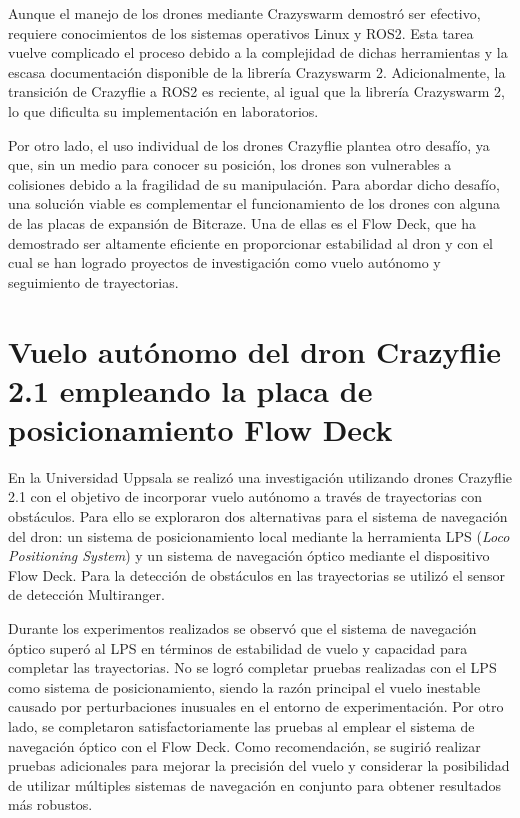 Aunque el manejo de los drones mediante Crazyswarm demostró ser efectivo, requiere conocimientos de los sistemas operativos Linux y ROS2. Esta tarea vuelve complicado el proceso debido a la complejidad de dichas herramientas y la escasa documentación disponible de la librería Crazyswarm 2. Adicionalmente, la transición de Crazyflie a ROS2 es reciente, al igual que la librería Crazyswarm 2, lo que dificulta su implementación en laboratorios. 

Por otro lado, el uso individual de los drones Crazyflie plantea otro desafío, ya que, sin un medio para conocer su posición, los drones son vulnerables a colisiones debido a la fragilidad de su manipulación. Para abordar dicho desafío, una solución viable es complementar el funcionamiento de los drones con alguna de las placas de expansión de Bitcraze. Una de ellas es el Flow Deck, que ha demostrado ser altamente eficiente en proporcionar estabilidad al dron y con el cual se han logrado proyectos de investigación como vuelo autónomo y seguimiento de trayectorias.

\newpage
\section{Vuelo autónomo del dron Crazyflie 2.1 empleando la placa de posicionamiento Flow Deck}
En la Universidad Uppsala \cite{Chadehumbe2020_tesis} se realizó una investigación utilizando drones Crazyflie 2.1 con el objetivo de incorporar vuelo autónomo a través de trayectorias con obstáculos. Para ello se exploraron dos alternativas para el sistema de navegación del dron: un sistema de posicionamiento local mediante la herramienta LPS (\textit{Loco Positioning System}) y un sistema de navegación óptico mediante el dispositivo Flow Deck. Para la detección de obstáculos en las trayectorias se utilizó el sensor de detección Multiranger. 

Durante los experimentos realizados se observó que el sistema de navegación óptico superó al LPS en términos de estabilidad de vuelo y capacidad para completar las trayectorias. No se logró completar pruebas realizadas con el LPS como sistema de posicionamiento, siendo la razón principal el vuelo inestable causado por perturbaciones inusuales en el entorno de experimentación. Por otro lado, se completaron satisfactoriamente las pruebas al emplear el sistema de navegación óptico con el Flow Deck. Como recomendación, se sugirió realizar pruebas adicionales para mejorar la precisión del vuelo y considerar la posibilidad de utilizar múltiples sistemas de navegación en conjunto para obtener resultados más robustos.